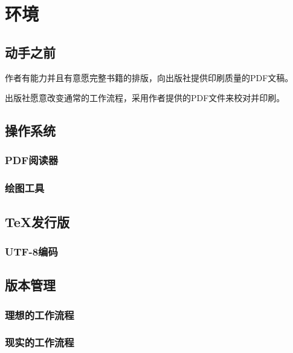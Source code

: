 \chapter{环境}

\section{动手之前}
作者有能力并且有意愿完整书籍的排版，向出版社提供印刷质量的PDF文稿。

出版社愿意改变通常的工作流程，采用作者提供的PDF文件来校对并印刷。

\section{操作系统}

\subsection{PDF阅读器}
\subsection{绘图工具}

\section{\TeX 发行版}
\subsection{UTF-8编码}

\section{版本管理}
\subsection{理想的工作流程}
\subsection{现实的工作流程}

